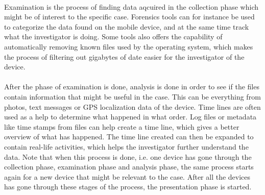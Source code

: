 \\
Examination is the process of finding data aqcuired in the collection phase which might be of interest to the specific case. Forensics tools can for instance be used to categorize the data found on the mobile device, and at the same time track what the investigator is doing. Some tools also offers the capability of automatically removing known files used by the operating system, which makes the process of filtering out gigabytes of date easier for the investigator of the device.\\
\\
After the phase of examination is done, analysis is done in order to see if the files contain information that might be useful in the case. This can be everything from photos, text messages or GPS localization data of the device. Time lines are often used as a help to determine what happened in what order. Log files or metadata like time stamps from files can help create a time line, which gives a better overview of what has happened. The time line created can then be expanded to contain real-life activities, which helps the investigator further understand the data. Note that when this process is done, i.e. one device has gone through the collection phase, examination phase and analysis phase, the same process starts again for a new device that might be relevant to the case. After all the devices has gone through these stages of the process, the presentation phase is started.
